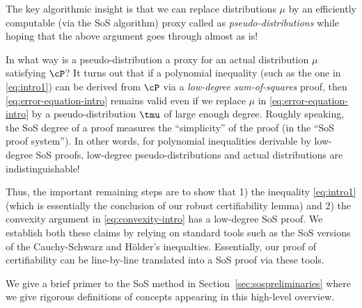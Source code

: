 The key algorithmic insight is that we can replace distributions $\mu$ by an efficiently computable (via the SoS algorithm) proxy called as \emph{pseudo-distributions} while hoping that the above argument goes through almost as is!%

In what way is a pseudo-distribution a proxy for an actual distribution $\mu$ satisfying $\cP$? It turns out that if a polynomial inequality (such as the one in \eqref{eq:intro1}) can be derived from $\cP$ via a \emph{low-degree sum-of-squares} proof, then \eqref{eq:error-equation-intro} remains valid even if we replace $\mu$ in \eqref{eq:error-equation-intro} by a pseudo-distribution $\tmu$ of large enough degree. Roughly speaking, the SoS degree of a proof measures the ``simplicity'' of the proof (in the ``SoS proof system''). In other words, for polynomial inequalities derivable by low-degree SoS proofs, low-degree pseudo-distributions and actual distributions are indistinguishable! %

Thus, the important remaining steps are to show that 1) the inequality \eqref{eq:intro1} (which is essentially the conclusion of our robust certifiability lemma) and 2) the convexity argument in \eqref{eq:convexity-intro} has a low-degree SoS proof. We establish both these claims by relying on standard tools such as the SoS versions of the Cauchy-Schwarz and H\"older's inequalties. Essentially, our  proof of certifiability can be line-by-line translated into a SoS proof via these tools. 

We give a brief primer to the SoS method in Section~\ref{sec:sospreliminaries} where we give rigorous definitions of concepts appearing in this high-level overview.

